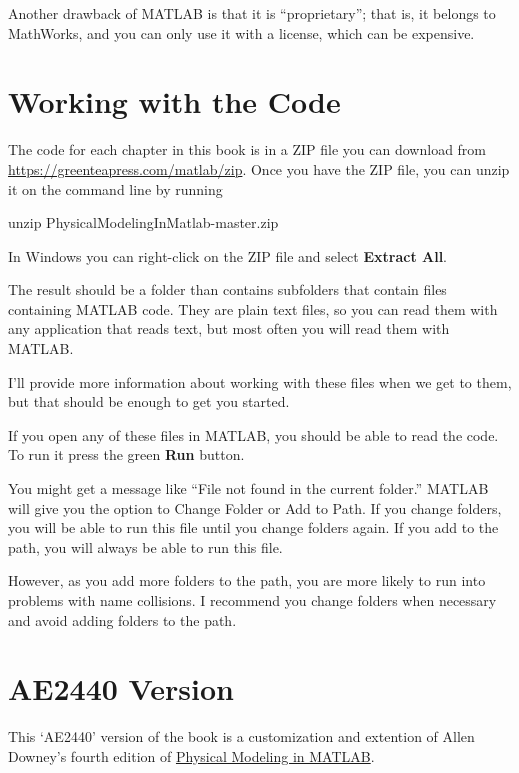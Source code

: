 Another drawback of MATLAB is that it is ``proprietary''; that is, it belongs to MathWorks, and you can only use it with a license, which can be expensive.

\section{Working with the Code}

The code for each chapter in this book is in a ZIP file you can download from \url{https://greenteapress.com/matlab/zip}.
Once you have the ZIP file, you can unzip it on the command line by running

\begin{code}
unzip PhysicalModelingInMatlab-master.zip
\end{code}

In Windows you can right-click on the ZIP file and select \textbf{Extract All}.

The result should be a folder than contains subfolders that contain files containing MATLAB code.
They are plain text files, so you can read them with any application that reads text, but most often you will read them with MATLAB.

I'll provide more information about working with these files when we get to them, but that should be enough to get you started.

If you open any of these files in MATLAB, you should be able to read the code.  To run it press the green \textbf{Run} button.

You might get a message like ``File not found in the current folder.''
MATLAB will give you the option to Change Folder or Add to Path.  If you change folders, you will be able to run this file until you change folders again.  If you add to the path, you will always be able to run this file.

However, as you add more folders to the path, you are more likely to run into problems with name collisions.
I recommend you change folders when necessary and avoid adding folders to the path.

\section{AE2440 Version}

This `AE2440' version of the book is a customization and extention of Allen Downey's fourth edition of \href{https://greenteapress.com/wp/physical-modeling-in-matlab/}{Physical Modeling in MATLAB}.

